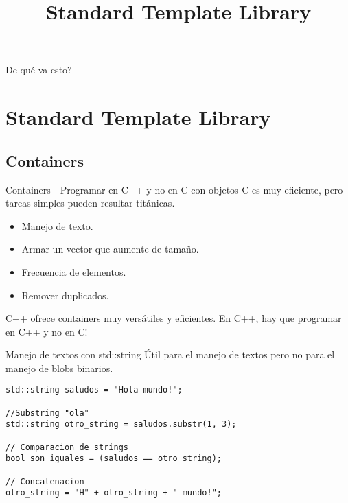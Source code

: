 

\title%
{Standard Template Library}

\subject{Standard Template Library}



\begin{frame}
   \titlepage
\end{frame}

\begin{frame}{De qu\'e va esto?}
   \tableofcontents
\end{frame}


\section{Standard Template Library}
\subsection{Containers}
\begin{frame}[fragile]{Containers - Programar en C++ y no en C con objetos}
C es muy eficiente, pero tareas simples pueden resultar tit\'anicas.
   \pause
   \begin{itemize}
      \item Manejo de texto.
      \item Armar un vector que aumente de tama\~no.
      \item Frecuencia de elementos.
      \item Remover duplicados.
   \end{itemize}
   \pause
\vphantom{X}
C++ ofrece containers muy vers\'atiles y eficientes. En C++, hay que programar en C++ y \alert{no en C}!
\end{frame}


\begin{frame}[fragile]{Manejo de textos con std::string}
\'Util para el manejo de textos pero no para el manejo de blobs binarios.
   \begin{lstlisting}[style=normal]
std::string saludos = "Hola mundo!";

//Substring "ola"
std::string otro_string = saludos.substr(1, 3);

// Comparacion de strings
bool son_iguales = (saludos == otro_string);

// Concatenacion
otro_string = "H" + otro_string + " mundo!";
   \end{lstlisting}
\end{frame}


